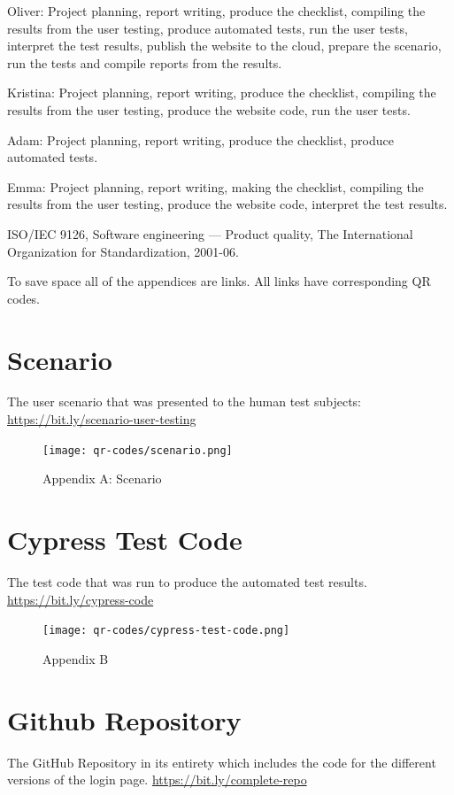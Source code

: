 \documentclass[journal,twocolumn]{IEEEtran}
\begin{document}
Oliver: Project planning, report writing, produce the checklist, compiling the results from the user testing, produce automated tests, run the user tests, interpret the test results, publish the website to the cloud, prepare the scenario, run the tests and compile reports from the results.

Kristina: Project planning, report writing, produce the checklist, compiling the results from the user testing, produce the website code, run the user tests.

Adam: Project planning, report writing, produce the checklist, produce automated tests.

Emma: Project planning, report writing, making the checklist, compiling the results from the user testing, produce the website code, interpret the test results.


\begin{thebibliography}{9}
     ISO/IEC 9126, Software engineering — Product quality, The International Organization for Standardization, 2001-06.
\end{thebibliography}

\appendices
To save space all of the appendices are links. All links have corresponding QR codes.
\section{Scenario}
The user scenario that was presented to the human test subjects:
\href{https://bit.ly/scenario-user-testing}{https://bit.ly/scenario-user-testing}
\begin{figure}[h!]
    \centering
    \texttt{[image: qr-codes/scenario.png]}
    \caption{Appendix A: Scenario}
    \label{fig:enter-label}
\end{figure}

\section{Cypress Test Code}
The test code that was run to produce the automated test results.
\href{https://bit.ly/cypress-code}{https://bit.ly/cypress-code}

\begin{figure}[H]
    \centering
    \texttt{[image: qr-codes/cypress-test-code.png]}
    \caption{Appendix B}
\end{figure}

\section{Github Repository}
The GitHub Repository in its entirety which includes the code for the different versions of the login page.
\href{https://bit.ly/complete-repo}{https://bit.ly/complete-repo}
\end{document}
